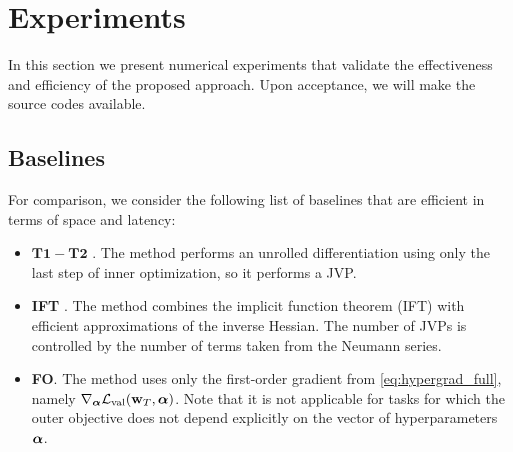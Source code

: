 \section{Experiments}
In this section we present numerical experiments that validate the effectiveness and efficiency of the proposed approach. Upon acceptance, we will make the source codes available.

\subsection{Baselines}

For comparison, we consider the following list of baselines that are efficient in terms of space and latency:
\begin{itemize}
    \item $\mathbf{T1-T2}$ \cite{luketina2016scalable}. The method performs an unrolled differentiation using only the last step of inner optimization, so it performs a JVP.
    \item \textbf{IFT} \cite{lorraine2020optimizing}. The method combines the implicit function theorem (IFT) with efficient approximations of the inverse Hessian. The number of JVPs is controlled by the number of terms taken from  the Neumann series.
    \item \textbf{FO}. The method uses only the first-order gradient from \eqref{eq:hypergrad_full}, namely $\nabla_{\boldsymbol{\mathbf{\alpha}}}\mathcal{L}_{\mathrm{val}}(\boldsymbol{\mathbf{w}}_T, \boldsymbol{\mathbf{\alpha}})$. Note that it is not applicable for tasks for which the outer objective does not depend explicitly on the vector of hyperparameters $\boldsymbol{\mathbf{\alpha}}$.
\end{itemize}




